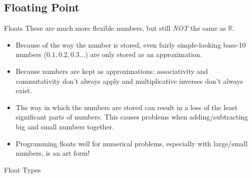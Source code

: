 \documentclass[smaller,handout,table]{beamer}
\begin{document}
\subsection{Floating Point}
\begin{frame}{Floats}
These are much more flexible numbers, but still \emph{NOT} the same as $\mathbb{R}$.
\begin{itemize}
\item Because of the way the number is stored, even fairly simple-looking base-10 numbers ($0.1, 0.2, 0.3\ldots$) are only stored as an approximation.
\item Because numbers are kept as approximations: associativity and commutativity don't always apply and multiplicative inverses don't always exist.
\item The way in which the numbers are stored can result in a loss of the least significant parts of numbers. This causes problems when adding/subtracting big and small numbers together.
\item Programming floats well for numerical problems, especially with large/small numbers, is an art form!
\end{itemize}

\begin{block}{Float Types}
\end{block}
\end{frame}
\end{document}
